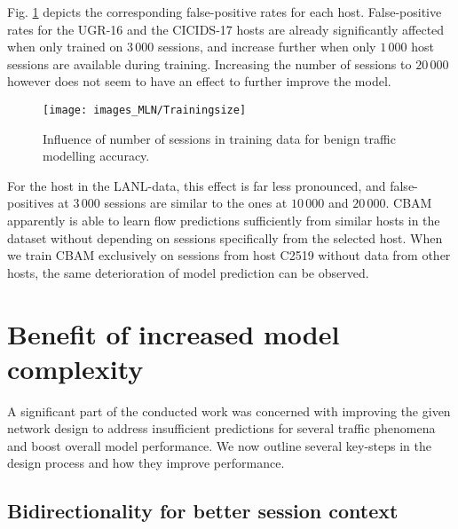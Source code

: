Fig. \ref{fig:Trainingsize} depicts the corresponding false-positive rates for each host. False-positive rates for the UGR-16 and the CICIDS-17 hosts are already significantly affected when only trained on $3\,000$ sessions, and increase further when only $1\,000$ host sessions are available during training. Increasing the number of sessions to $20\,000$ however does not seem to have an effect to further improve the model.

\begin{figure}
\centering
\texttt{[image: images\_MLN/Trainingsize]} 
\caption{Influence of number of sessions in training data for benign traffic modelling accuracy.}\label{fig:Trainingsize}
\end{figure}
For the host in the LANL-data, this effect is far less pronounced, and false-positives at $3\,000$ sessions are similar to the ones at $10\,000$ and $20\,000$. CBAM apparently is able to learn flow predictions sufficiently from similar hosts in the dataset without depending on sessions specifically from the selected host. When we train CBAM exclusively on sessions from host C2519 without data from other hosts, the same deterioration of model prediction can be observed.

 






\section{Benefit of increased model complexity}\label{Sec:Modelcompl}

A significant part of the conducted work was concerned with improving the given network design to address insufficient predictions for several traffic phenomena and boost overall model performance. We now outline several key-steps in the design process and how they improve performance.

\subsection{Bidirectionality for better session context}\label{Sec:Bidir}

